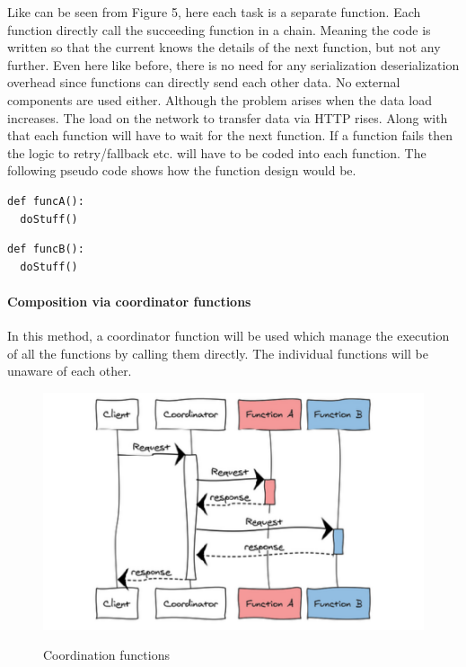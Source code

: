 \documentclass[12pt,titlepage]{article}
\begin{document}
Like can be seen from Figure 5, here each task is a separate function. Each
function directly call the succeeding function in a chain. Meaning the code is
written so that the current knows the details of the next function, but not any
further. Even here like before, there is no need for any serialization
deserialization overhead since functions can directly send each other data. No
external components are used either. Although the problem arises when the data
load increases. The load on the network to transfer data via HTTP rises. Along
with that each function will have to wait for the next function. If a function
fails then the logic to retry/fallback etc. will have to be coded into each
function. The following pseudo code shows how the function design would be.


\begin{lstlisting}
def funcA():
  doStuff()
\end{lstlisting}


\begin{lstlisting}
def funcB():
  doStuff()
\end{lstlisting}

\paragraph{Composition via coordinator functions}
\label{sec:org10249e1}

In this method, a coordinator function will be used which manage the execution
of all the functions by calling them directly. The individual functions will be
unaware of each other. 

\begin{figure}
\caption{Coordination functions}
\centering
\includegraphics[width=150mm]{./thesis_images/coordination.png}
\label{fig:Coordination}
\end{figure}
\end{document}
